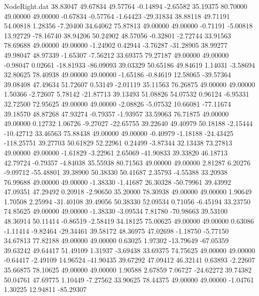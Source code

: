 \begin{filecontents}{NodeRight.dat}
  38.83047   49.67834   49.57764    -0.14894   -2.65582   35.19375   80.70000   49.00000   49.00000   -0.67834   -0.57764   -1.64423  -29.31834
  38.88118   49.71191   54.00818     1.28356   -7.20400   34.64062   75.87813   49.00000   49.00000   -0.71191   -5.00818   13.92729  -78.16740
  38.94206   50.24902   48.57056    -0.32801   -2.72744   33.91563   78.69688   49.00000   49.00000   -1.24902    0.42944   -3.76287  -31.28905
  38.99277   49.98047   48.97339    -1.65307   -7.56212   33.69375   79.27187   49.00000   49.00000   -0.98047    0.02661  -18.81933  -86.09093
  39.03329   50.65186   49.84619     1.14031   -3.58694   32.80625   78.40938   49.00000   49.00000   -1.65186   -0.84619   12.58065  -39.57364
  39.08408   47.49634   51.72607     0.53149   -2.01119   35.11563   76.26875   49.00000   49.00000    1.50366   -2.72607    5.78142  -21.87713
  39.13493   51.08826   54.07532     0.96124   -6.95331   32.72500   72.95625   49.00000   49.00000   -2.08826   -5.07532   10.66081  -77.11674
  39.18570   48.87268   47.93274    -0.79357   -1.93957   33.59063   76.71875   49.00000   49.00000    0.12732    1.06726   -9.27027  -22.65755
  39.22640   49.40979   50.18188    -2.15444  -10.42712   33.46563   75.88438   49.00000   49.00000   -0.40979   -1.18188  -24.43425 -118.25751
  39.27703   50.61829   52.22961     0.24499   -3.87344   32.13438   73.27813   49.00000   49.00000   -1.61829   -3.22961    2.65069  -41.90833
  39.33820   46.18713   42.79724    -0.79357   -4.84038   35.55938   80.71563   49.00000   49.00000    2.81287    6.20276   -9.09712  -55.48801
  39.38900   50.38330   50.41687     2.35793   -4.55388   33.20938   76.99688   49.00000   49.00000   -1.38330   -1.41687   26.30328  -50.79961
  39.43992   47.09351   47.29492     0.20918   -2.90650   35.20000   78.30938   49.00000   49.00000    1.90649    1.70508    2.25994  -31.40108
  39.49056   50.38330   52.09534     0.71056   -6.45194   33.23750   74.85625   49.00000   49.00000   -1.38330   -3.09534    7.81780  -70.98663
  39.53100   48.36914   50.11414    -0.86519   -2.58419   34.18125   75.00625   49.00000   49.00000    0.63086   -1.11414   -9.82464  -29.34461
  39.58172   48.36975   47.02698    -1.18750   -5.77150   34.67813   77.82188   49.00000   49.00000    0.63025    1.97302  -13.79649  -67.05359
  39.63242   49.64417   51.49109     1.31937   -3.69438   33.69375   74.75625   49.00000   49.00000   -0.64417   -2.49109   14.96524  -41.90435
  39.67292   47.09412   46.32141     0.63893   -2.22607   35.66875   78.10625   49.00000   49.00000    1.90588    2.67859    7.06727  -24.62272
  39.74382   50.04761   47.69775     1.10449   -7.27562   33.90625   78.44375   49.00000   49.00000   -1.04761    1.30225   12.94811  -85.29307

\end{filecontents}
